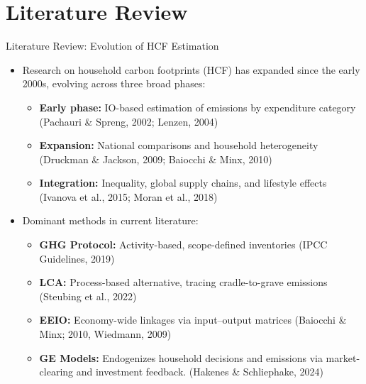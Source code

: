 \documentclass{beamer}
\begin{document}
\section{Literature Review}
\begin{frame}{Literature Review: Evolution of HCF Estimation}
\small
\vspace{-2.5em}
\begin{itemize}
  \item Research on household carbon footprints (HCF) has expanded since the early 2000s, evolving across three broad phases:
  \begin{itemize}
    \footnotesize
    \item \textbf{Early phase:} IO-based estimation of emissions by expenditure category (Pachauri \& Spreng, 2002; Lenzen, 2004)
    \item \textbf{Expansion:} National comparisons and household heterogeneity (Druckman \& Jackson, 2009; Baiocchi \& Minx, 2010)
    \item \textbf{Integration:} Inequality, global supply chains, and lifestyle effects (Ivanova et al., 2015; Moran et al., 2018)
  \end{itemize}

  \item Dominant methods in current literature:
 
  \begin{itemize}
    \item  \footnotesize \textbf{GHG Protocol:} Activity-based, scope-defined inventories (IPCC Guidelines, 2019)
     \item \footnotesize \textbf{LCA:} Process-based alternative, tracing cradle-to-grave emissions (Steubing et al., 2022)
     \item \footnotesize \textbf{EEIO:} Economy-wide linkages via input–output matrices (Baiocchi \& Minx; 2010, Wiedmann, 2009)
     \item \footnotesize \textbf{GE Models:} Endogenizes household decisions and emissions via market-clearing and investment feedback. (Hakenes \& Schliephake, 2024)
  \end{itemize}
\end{itemize}
\end{frame}
\end{document}
